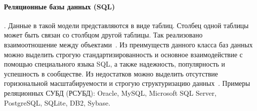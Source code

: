 \paragraph{Реляционные базы данных (SQL)}. Данные в такой модели представляются в виде
таблиц. Столбец одной таблицы может быть связан со столбцом другой таблицы.
Так реализовано взаимоотношение между объектами~\cite{koryaginModeliBazDannyh2020,smallcombeSQLVsNoSQL,
	savoskinIssledovanieSposobovPrimeneniya2019, kleymenovNoSQLRelyacionnyeBazy2022}.
Из преимуществ данного класса баз данных можно выделить
строгую стандартизированность и основное взаимодействие с помощью специального языка SQL,
а также надежность, популярность и успешность в сообществе.
Из недостатков можно выделить отсутствие горизональной масштабируемости
и строгую структуризацию данных~\cite{koryaginModeliBazDannyh2020}.
Примеры реляционных СУБД (РСУБД): Oracle, MySQL, Microsoft SQL Server, PostgreSQL, SQLite, DB2, Sybase.


